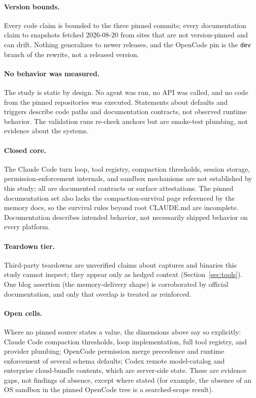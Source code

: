 \documentclass{article}
\newcommand{\codex}[0]{Codex}
\newcommand{\occ}[0]{OpenCode}
\newcommand{\ccc}[0]{Claude Code}
\begin{document}
\paragraph{Version bounds.} Every code claim is bounded to the three pinned
commits; every documentation claim to snapshots fetched 2026-08-20 from
sites that are not version-pinned and can drift. Nothing generalizes to
newer releases, and the \occ{} pin is the \texttt{dev} branch of the
rewrite, not a released version.

\paragraph{No behavior was measured.} The study is static by design. No
agent was run, no API was called, and no code from the pinned repositories
was executed. Statements about defaults and triggers describe code paths
and documentation contracts, not observed runtime behavior. The validation
runs re-check anchors but are smoke-test plumbing, not evidence about the
systems.

\paragraph{Closed core.} The \ccc{} turn loop, tool registry, compaction
thresholds, session storage, permission-enforcement internals, and sandbox
mechanisms are not established by this study; all are documented contracts
or surface attestations. The pinned documentation set also lacks the
compaction-survival page referenced by the memory docs, so the survival
rules beyond root CLAUDE.md are incomplete. Documentation describes
intended behavior, not necessarily shipped behavior on every platform.

\paragraph{Teardown tier.} Third-party teardowns are unverified claims
about captures and binaries this study cannot inspect; they appear only as
hedged context (Section~\ref{sec:tools}). One blog assertion (the
memory-delivery shape) is corroborated by official documentation, and only
that overlap is treated as reinforced.

\paragraph{Open cells.} Where no pinned source states a value, the
dimensions above say so explicitly: \ccc{} compaction thresholds, loop
implementation, full tool registry, and provider plumbing; \occ{}
permission merge precedence and runtime enforcement of several schema
defaults; \codex{} remote model-catalog and enterprise cloud-bundle
contents, which are server-side state. These are evidence gaps, not
findings of absence, except where stated (for example, the absence of an OS
sandbox in the pinned \occ{} tree is a searched-scope result).
\end{document}
